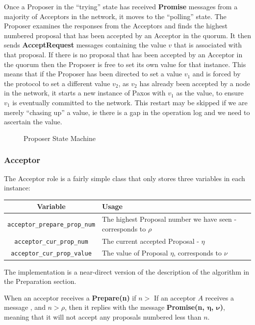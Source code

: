 \documentclass[12pt,twoside,notitlepage]{report}
\newcommand{\lwincludegraphics}[2][]{%
  \sbox{0}{\texttt{[image: \#2]}}%
  \ifdim\wd0>\linewidth
    \resizebox{\linewidth}{!}{\box0 }%
  \else
    \leavevmode\box0
  \fi}
\newcommand{\msg}[1] {{\bf #1}}         %
\begin{document}
Once a Proposer in the ``trying'' state has received \msg{Promise} messages from a majority of
Acceptors in the network, it moves to the ``polling'' state. The Proposer examines the responses
from the Acceptors and finds the highest numbered proposal that has been accepted by an Acceptor
in the quorum. It then sends \msg{AcceptRequest} messages containing the value $v$ that is
associated with that proposal. If there is no proposal that has been accepted by an Acceptor in
the quorum then the Proposer is free to set its own value for that instance. This means that if
the Proposer has been directed to set a value $v_1$ and is forced by the protocol to set a
different value $v_2$, as $v_2$ has already been accepted by a node in the network, it starts a
new instance of Paxos with $v_1$ as the value, to ensure $v_1$ is eventually committed to the
network. This restart may be skipped if we are merely ``chasing up'' a value, ie there is a gap in
the operation log and we need to ascertain the value.


\begin{figure}[htb]
\centering
\lwincludegraphics[scale=0.5]{figs/proposer-state-machine.eps}
\caption{\label{fig:proposer-state-machine}Proposer State Machine}
\end{figure}

\subsubsection{Acceptor}

The Acceptor role is a fairly simple class that only stores three variables in each instance:

\begin{tabular}{ | c | p{7cm} | }
  \hline
  {\bf Variable} & {\bf Usage} \\ \hline
  \verb+acceptor_prepare_prop_num+ & The highest Proposal number we have seen - corresponds to
  $\rho$ \\ \hline
  \verb+acceptor_cur_prop_num+ & The current accepted Proposal - $\eta$ \\ \hline
  \verb+acceptor_cur_prop_value+ & The value of Proposal $\eta$, corresponds to $\nu$ \\ \hline
\end{tabular}

The implementation is a near-direct version of the description of the algorithm in the Preparation
section.

When an acceptor receives a \msg{Prepare(n)} if $n > $
If an acceptor $A$ receives a message , and $n > \rho$, then it replies with the
message \msg{Promise(n, $\bm{\eta}$, $\bm{\nu}$)}, meaning that it will not accept any proposals
numbered less than $n$.
\end{document}
